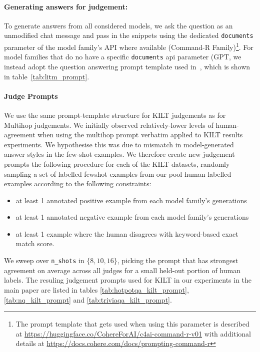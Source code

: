 \documentclass[11pt]{article}
\begin{document}
\paragraph{Generating answers for judgement:} To generate answers from all considered models, we ask the question as an unmodified chat message and pass in the snippets using the dedicated \texttt{documents} parameter of the model family's API where available (Command-R Family)\footnote{The prompt template that gets used when using this parameter is described at \url{https://huggingface.co/CohereForAI/c4ai-command-r-v01} with additional details at \url{https://docs.cohere.com/docs/prompting-command-r}}. 
For model families that do no have a specific \texttt{documents} api parameter (GPT, we instead adopt the question answering prompt template used in~\citet{liu2024lost}, which is shown in table~\ref{tab:litm_prompt}.

\paragraph{Judge Prompts} We use the same prompt-template structure for KILT judgements as for Multihop judgements. We initially observed relatively-lower levels of human-agreement when using the multihop prompt verbatim applied to KILT results experiments. 
We hypothesise this was due to mismatch in model-generated answer styles in the few-shot examples.
We therefore create new judgement prompts the following procedure for each of the KILT datasets, randomly sampling a set of labelled fewshot examples from our pool human-labelled examples according to the following constraints:
\begin{itemize}
    \item at least 1 annotated positive example from each model family's generations
    \item at least 1 annotated negative example from each model family's generations
    \item at least 1 example where the human disagrees with keyword-based exact match score.
\end{itemize}

We sweep over \texttt{n\_shots} in $\{8,10,16\}$, picking the prompt that has strongest agreement on average across all judges for a small held-out portion of human labels. The resuling judgement prompts used for KILT in our experiments in the main paper are listed in tables \ref{tab:hotpotqa_kilt_prompt}, \ref{tab:nq_kilt_prompt} and \ref{tab:triviaqa_kilt_prompt}.
\end{document}
